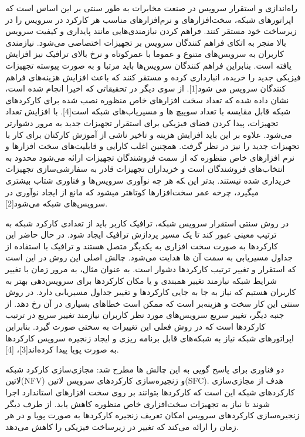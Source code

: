 
راه‌اندازی و استقرار سرویس در صنعت مخابرات به طور سنتی بر این اساس است که اپراتورهای شبکه، سخت‌افزارهای و نرم‌افزارهای مناسب هر کارکرد در سرویس را در زیرساخت خود مستقر کنند.
فراهم کردن نیازمندی‌هایی مانند پایداری و کیفیت سرویس بالا منجر به اتکای فراهم کنندگان سرویس بر تجهیزات اختصاصی می‌شود.
نیازمندی کاربران به سرویس‌های متنوع و عموما با عمرکوتاه و نرخ بالای ترافیک نیز افزایش یافته است.
بنابراین فراهم کنندگان سرویس‌ها باید مرتبا و به صورت پیوسته تجهیزات فیزیکی جدید را خریده، انبارداری کرده و مستقر کنند که باعث افزایش هزینه‌های فراهم کنندگان سرویس می شود[1].
از سوی دیگر در تحقیقاتی که اخیرا انجام شده است، نشان داده شده که تعداد سخت افزارهای خاص منظوره نصب شده برای کارکردهای شبکه قابل مقایسه با تعداد سوییچ ها و مسیریاب‌های شبکه
است[4].
با افزایش تعداد تجهیزات، پیدا کردن فضای فیزیکی برای استقرار تجهیزات جدید به مرور دشوارتر می‌شود.
علاوه بر این باید افزایش هزینه و تاخیر ناشی از آموزش کارکنان برای کار با تجهیزات جدید را نیز در نظر گرفت.
همچنین اغلب کارایی و قابلیت‌های سخت افزارها و نرم افزارهای خاص منظوره که از سمت فروشندگان تجهیزات ارائه می‌شود محدود به انتخاب‌های فروشندگان است
و خریداران تجهیزات قادر به سفارشی‌سازی تجهیزات خریداری شده نیستند.
بدتر این ‍که هر چه نوآوری سرویس‌ها و فناوری شتاب بیشتری می‍گیرد، چرخه عمر سخت‌افزارها کوتاه‍تر می‍شود که مانع از ایجاد نوآوری در سرویس‌های شبکه می‌شود[2].

در روش سنتی استقرار سرویس شبکه، ترافیک کاربر باید از تعدادی کارکرد شبکه به ترتیب معینی عبور کند تا یک مسیر پردازش ترافیک ایجاد شود.
در حال حاضر این کارکردها به صورت سخت افزاری به یکدیگر متصل هستند و ترافیک با استفاده از جداول مسیریابی به سمت آن ها هدایت می‌شود.
چالش اصلی این روش در این است که استقرار و تغییر ترتیب کارکردها دشوار است.
به عنوان مثال، به مرور زمان با تغییر شرایط شبکه نیازمند تغییر همبندی و یا مکان کارکردها برای سرویس‌دهی بهتر به کاربران هستیم
که نیاز به جا به جایی کارکردها و تغییر جداول مسیریابی دارد.
در روش سنتی این کار سخت و هزینه‌بر است که ممکن است خطاهای بسیاری در آن رخ دهد.
از جنبه دیگر، تغییر سریع سرویس‌های مورد نظر کاربران نیازمند تغییر سریع در ترتیب کارکردها است که در روش فعلی این تغییرات به سختی صورت گیرد.
بنابراین اپراتورهای شبکه نیاز به شبکه‌های قابل برنامه ریزی و ایجاد زنجیره سرویس کارکردها به صورت پویا پیدا کرده‌اند[3]، [4].‍‍

دو فناوری برای پاسخ گویی به این چالش ها مطرح شد: مجازی‌سازی کارکرد شبکه ‌لاتین{(NFV)} و زنجیره‌سازی کارکردهای سرویس ‌لاتین{(SFC)}.‍
هدف از مجازی‌سازی کارکردهای شبکه این است که کارکردها بتوانند بر روی سخت افزارهای استاندارد اجرا شوند تا
نیاز به تجهیزات سخت‌افزاری خاص منظوره کاهش یابد.
از طرف دیگر زنجیره‌سازی کارکردهای سرویس امکان تعریف زنجیره کارکردها به صورت پویا و در هر زمان را ارائه می‌کند که تغییر در زیرساخت فیزیکی را کاهش می‌دهد.

